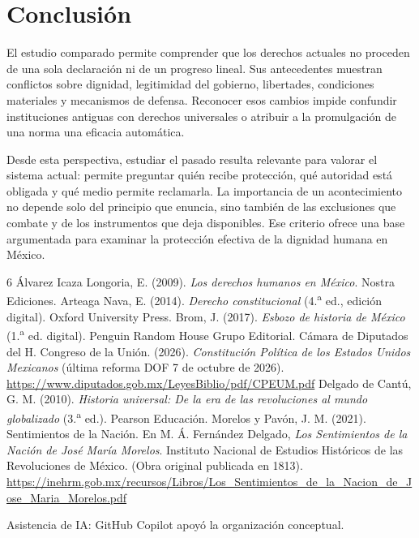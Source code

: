 \documentclass[12pt,spanish,letterpaper,oneside]{article}
\begin{document}
\section*{Conclusi\'on}
El estudio comparado permite comprender que los derechos actuales no
proceden de una sola declaraci\'on ni de un progreso lineal. Sus antecedentes
muestran conflictos sobre dignidad, legitimidad del gobierno, libertades,
condiciones materiales y mecanismos de defensa. Reconocer esos cambios
impide confundir instituciones antiguas con derechos universales o atribuir
a la promulgaci\'on de una norma una eficacia autom\'atica.

Desde esta perspectiva, estudiar el pasado resulta relevante para valorar
el sistema actual: permite preguntar qui\'en recibe protecci\'on, qu\'e autoridad
est\'a obligada y qu\'e medio permite reclamarla. La importancia de un
acontecimiento no depende solo del principio que enuncia, sino tambi\'en
de las exclusiones que combate y de los instrumentos que deja disponibles.
Ese criterio ofrece una base argumentada para examinar la protecci\'on
efectiva de la dignidad humana en M\'exico.

\clearpage
\begin{thebibliography}{6}
\'Alvarez Icaza Longoria, E. (2009). \emph{Los derechos humanos en M\'exico}. Nostra Ediciones.
Arteaga Nava, E. (2014). \emph{Derecho constitucional} (4.\textsuperscript{a} ed., edici\'on digital). Oxford University Press.
Brom, J. (2017). \emph{Esbozo de historia de M\'exico} (1.\textsuperscript{a} ed. digital). Penguin Random House Grupo Editorial.
C\'amara de Diputados del H. Congreso de la Uni\'on. (2026).
\emph{Constituci\'on Pol\'itica de los Estados Unidos Mexicanos}
(\'ultima reforma DOF 7 de octubre de 2026).
\url{https://www.diputados.gob.mx/LeyesBiblio/pdf/CPEUM.pdf}
Delgado de Cant\'u, G. M. (2010). \emph{Historia universal: De la era de las revoluciones al mundo globalizado} (3.\textsuperscript{a} ed.). Pearson Educaci\'on.
Morelos y Pav\'on, J. M. (2021). Sentimientos de la Naci\'on.
En M. \'A. Fern\'andez Delgado, \emph{Los Sentimientos de la Naci\'on de Jos\'e Mar\'ia Morelos}.
Instituto Nacional de Estudios Hist\'oricos de las Revoluciones de M\'exico.
(Obra original publicada en 1813).
\url{https://inehrm.gob.mx/recursos/Libros/Los_Sentimientos_de_la_Nacion_de_Jose_Maria_Morelos.pdf}
\end{thebibliography}
\noindent Asistencia de IA: GitHub Copilot apoy\'o la organizaci\'on conceptual.
\end{document}
